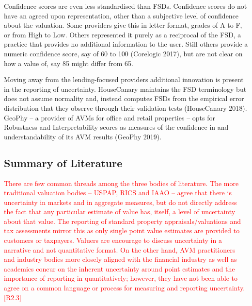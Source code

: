 \documentclass[colTwo]{anon}
\theoremstyle{definition}
\begin{document}
Confidence scores are even less standardised than FSDs.  Confidence scores do not have an agreed upon representation, other than a subjective level of confidence about the valuation.  Some providers give this in letter format, grades of A to F, or from High to Low.  Others represented it purely as a reciprocal of the FSD, a practice that provides no additional information to the user.  Still others provide a numeric confidence score, say of 60 to 100 (Corelogic 2017), but are not clear on how a value of, say 85 might differ from 65.  

Moving away from the lending-focused providers additional innovation is present in the reporting of uncertainty.  HouseCanary maintains the FSD terminology but does not assume normality and, instead computes FSDs from the empirical error distribution that they observe through their validation tests (HouseCanary 2018).  GeoPhy -- a provider of AVMs for office and retail properties -- opts for Robustness and Interpretability scores as measures of the confidence in and understandability of its AVM results (GeoPhy 2019).  

\subsection{Summary of Literature}

\textcolor{red}{There are few common threads among the three bodies of literature.  The more traditional valuation bodies -- USPAP, RICS and IAAO -- agree that there is uncertainty in markets and in aggregate measures, but do not directly address the fact that any particular estimate of value has, itself, a level of uncertainty about that value.  The reporting of standard property appraisals/valuations and tax assessments mirror this as only single point value estimates are provided to customers or taxpayers. Valuers are encourage to discuss uncertainty in a narrative and not quantitative format. On the other hand, AVM practitioners and industry bodies more closely aligned with the financial industry as well as academics concur on the inherent uncertainty around point estimates and the importance of reporting in quantitatively; however, they have not been able to agree on a common language or process for measuring and reporting uncertainty.[R2.3]}  
\end{document}
